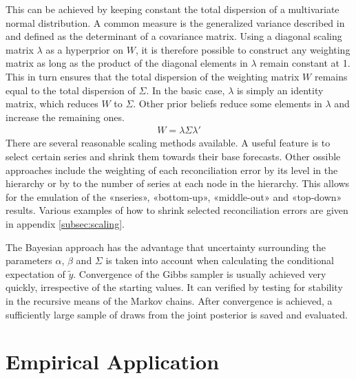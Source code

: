\documentclass[a4paper,fleqn,11pt]{article}
\begin{document}
\begin{enumerate}
This can be achieved by keeping constant the total dispersion of a multivariate normal distribution. A common measure is the generalized variance described in \cite{Mustonen1997} and defined as the determinant of a covariance matrix. Using a diagonal scaling matrix $\lambda$ as a hyperprior on $W$, it is therefore possible to construct any weighting matrix as long as the product of the diagonal elements in $\lambda$ remain constant at 1. This in turn ensures that the total dispersion of the weighting matrix $W$ remains equal to the total dispersion of $\Sigma$. In the basic case, $\lambda$ is simply an identity matrix, which reduces $W$ to $\Sigma$. Other prior beliefs reduce some elements in $\lambda$ and increase the remaining ones.
\begin{align*}
W =  \lambda\Sigma\lambda'
\end{align*}
There are several reasonable scaling methods available. A useful feature is to select certain series and shrink them towards their base forecasts. Other ossible approaches include the weighting of each reconciliation error by its level in the hierarchy or by to the number of series at each node in the hierarchy. This allows for the emulation of the «nseries», «bottom-up», «middle-out» and «top-down» results. Various examples of how to shrink selected reconciliation errors are given in appendix \ref{subsec:scaling}.

\end{enumerate}

\noindent The Bayesian approach has the advantage that uncertainty surrounding the parameters $\alpha$, $\beta$ and $\Sigma$ is taken into account when calculating the conditional expectation of $\tilde{y}$. Convergence of the Gibbs sampler is usually achieved very quickly, irrespective of the starting values. It can verified by testing for stability in the recursive means of the Markov chains. After convergence is achieved, a sufficiently large sample of draws from the joint posterior is saved and evaluated.\\

\clearpage


\section{Empirical Application}
\label{sec:appl}
\end{document}
